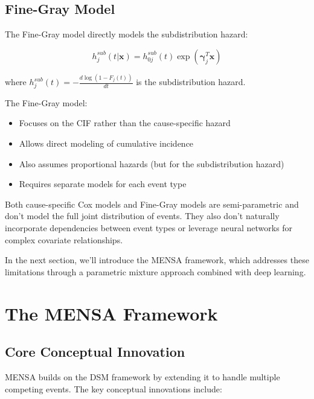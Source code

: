 \subsection{Fine-Gray Model}

The Fine-Gray model directly models the subdistribution hazard:

\begin{equationbox}[title=Fine-Gray Model]
\begin{equation}
h_j^{sub}(t|\mathbf{x}) = h_{0j}^{sub}(t) \exp(\boldsymbol{\gamma}_j^T \mathbf{x})
\end{equation}

where $h_j^{sub}(t) = -\frac{d\log(1-F_j(t))}{dt}$ is the subdistribution hazard.
\end{equationbox}

The Fine-Gray model:
\begin{itemize}
    \item Focuses on the CIF rather than the cause-specific hazard
    \item Allows direct modeling of cumulative incidence
    \item Also assumes proportional hazards (but for the subdistribution hazard)
    \item Requires separate models for each event type
\end{itemize}

\begin{notebox}
Both cause-specific Cox models and Fine-Gray models are semi-parametric and don't model the full joint distribution of events. They also don't naturally incorporate dependencies between event types or leverage neural networks for complex covariate relationships.
\end{notebox}

In the next section, we'll introduce the MENSA framework, which addresses these limitations through a parametric mixture approach combined with deep learning.

\section{The MENSA Framework}

\subsection{Core Conceptual Innovation}

MENSA builds on the DSM framework by extending it to handle multiple competing events. The key conceptual innovations include:

